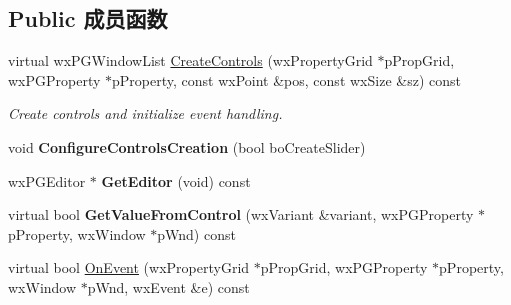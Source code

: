 \subsection*{Public 成员函数}
\begin{DoxyCompactItemize}
\item 
\hypertarget{classwx_p_g_custom_spin_ctrl_editor_a6d5c3f9fa7042783c79198ad247898bc}{virtual wx\+P\+G\+Window\+List \hyperlink{classwx_p_g_custom_spin_ctrl_editor_a6d5c3f9fa7042783c79198ad247898bc}{Create\+Controls} (wx\+Property\+Grid $\ast$p\+Prop\+Grid, wx\+P\+G\+Property $\ast$p\+Property, const wx\+Point \&pos, const wx\+Size \&sz) const }\label{classwx_p_g_custom_spin_ctrl_editor_a6d5c3f9fa7042783c79198ad247898bc}

\begin{DoxyCompactList}\small\item\em Create controls and initialize event handling. \end{DoxyCompactList}\item 
\hypertarget{classwx_p_g_custom_spin_ctrl_editor_a0da662438f93c0e6f08720e745fdfb4d}{void {\bfseries Configure\+Controls\+Creation} (bool bo\+Create\+Slider)}\label{classwx_p_g_custom_spin_ctrl_editor_a0da662438f93c0e6f08720e745fdfb4d}

\item 
\hypertarget{classwx_p_g_custom_spin_ctrl_editor_a4dd13b458344ccf68ef7829e42f5911a}{wx\+P\+G\+Editor $\ast$ {\bfseries Get\+Editor} (void) const }\label{classwx_p_g_custom_spin_ctrl_editor_a4dd13b458344ccf68ef7829e42f5911a}

\item 
\hypertarget{classwx_p_g_custom_spin_ctrl_editor_ac3e61aecb1ddca099cc17de3a0728187}{virtual bool {\bfseries Get\+Value\+From\+Control} (wx\+Variant \&variant, wx\+P\+G\+Property $\ast$p\+Property, wx\+Window $\ast$p\+Wnd) const }\label{classwx_p_g_custom_spin_ctrl_editor_ac3e61aecb1ddca099cc17de3a0728187}

\item 
\hypertarget{classwx_p_g_custom_spin_ctrl_editor_a6960bc3409b99c1b9c097b9589aacdcb}{virtual bool \hyperlink{classwx_p_g_custom_spin_ctrl_editor_a6960bc3409b99c1b9c097b9589aacdcb}{On\+Event} (wx\+Property\+Grid $\ast$p\+Prop\+Grid, wx\+P\+G\+Property $\ast$p\+Property, wx\+Window $\ast$p\+Wnd, wx\+Event \&e) const }\label{classwx_p_g_custom_spin_ctrl_editor_a6960bc3409b99c1b9c097b9589aacdcb}


\end{DoxyCompactItemize}
